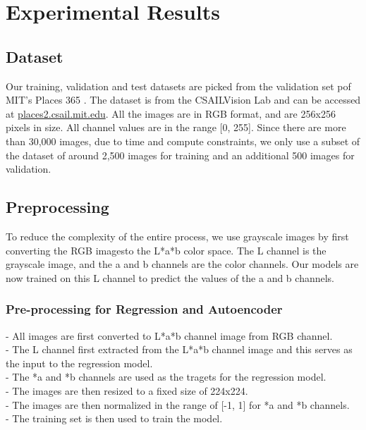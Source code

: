 \documentclass{article}
\begin{document}


\section{Experimental Results}


\subsection{Dataset}
Our training, validation and test datasets are picked from the validation set pof MIT's Places 365 \cite{7} . The dataset is from the CSAILVision Lab and can be accessed at \url{places2.csail.mit.edu}.
All the images are in RGB format, and are 256x256 pixels in size. All channel values are in the range [0, 255].
Since there are more than 30,000 images, due to time and compute constraints, we only use a subset of the dataset of around 2,500 images for training and an additional 500 images for validation.

\subsection{Preprocessing}
To reduce the complexity of the entire process, we use grayscale images by first converting the RGB imagesto the L*a*b color space.
The L channel is the grayscale image, and the a and b channels are the color channels.
Our models are now trained on this L channel to predict the values of the a and b channels.

\subsubsection{Pre-processing for Regression and Autoencoder}
    - All images are first converted to L*a*b channel image from RGB channel. \\
    - The L channel first extracted from the L*a*b channel image and this serves as the input to the regression model. \\
    - The *a and *b channels are used as the tragets for the regression model. \\
    - The images are then resized to a fixed size of 224x224. \\
    - The images are then normalized in the range of [-1, 1] for *a and *b channels. \\
    - The training set is then used to train the model. \\
\end{document}
